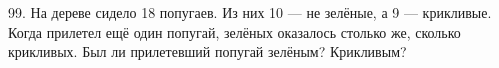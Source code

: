 99. На дереве сидело 18 попугаев. Из них 10 --- не зелёные, а 9 --- крикливые. Когда прилетел ещё один попугай, зелёных оказалось столько же, сколько крикливых. Был ли прилетевший попугай зелёным? Крикливым?\\
